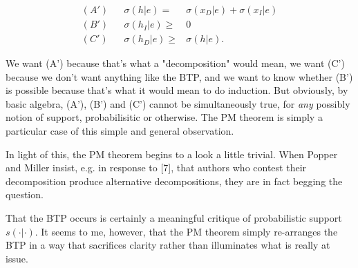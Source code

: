 \documentclass[twoside,11pt]{article}
\numberwithin{equation}{section}
\begin{document}
\begin{align*}
%
(A')&& \sigma(h | e) ={}& \sigma(x_D | e) + \sigma(x_I | e)\\
(B')&& \sigma(h_I | e) \ge{}& 0\\
(C')&& \sigma(h_D | e) \ge{}& \sigma(h | e).
%
\end{align*}

We want (A') because that's what a "decomposition" would mean, we want (C')
because we don't want anything like the BTP, and we want to know whether (B') is
possible because that's what it would mean to do induction.  But obviously, by
basic algebra, (A'), (B') and (C') cannot be simultaneously true, for \emph{any}
possibly notion of support, probabilisitic or otherwise.  The PM theorem is
simply a particular case of this simple and general observation.

In light of this, the PM theorem begins to a look a little trivial. When Popper
and Miller insist, e.g. in response to [7], that authors who contest their
decomposition produce alternative decompositions, they are in fact begging the
question.

That the BTP occurs is certainly a meaningful critique of probabilistic support
$s(\cdot | \cdot)$.  It seems to me, however, that the PM theorem simply
re-arranges the BTP in a way that sacrifices clarity rather than illuminates
what is really at issue.







\printbibliography{}
\end{document}
